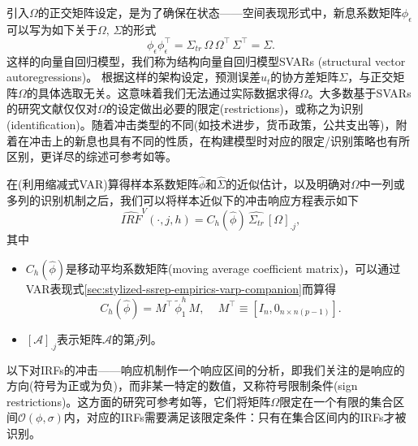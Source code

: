 引入$\Omega$的正交矩阵设定，是为了确保在状态——空间表现形式中，新息系数矩阵$\phi_{\epsilon}$可以写为如下关于$\Omega, \, \Sigma$的形式
\begin{equation}
  \label{eq:stylized-ssrep-svar-errorcoef-varcov}
  \phi_{\epsilon} \phi_{\epsilon}^{\top} = \Sigma_{tr} \, \Omega \, \Omega^{\top} \, \Sigma^{\top} = \Sigma.
\end{equation}
这样的向量自回归模型，我们称为结构向量自回归模型SVARs (structural vector autoregressions)。
根据这样的架构设定，预测误差$u_{t}$的协方差矩阵$\Sigma$，与正交矩阵$\Omega$的具体选取无关。这意味着我们无法通过实际数据求得$\Omega$。大多数基于SVARs的研究文献仅仅对$\Omega$的设定做出必要的限定(restrictions)，或称之为识别(identification)。随着冲击类型的不同(如技术进步，货币政策，公共支出等)，附着在冲击上的新息也具有不同的性质，在构建模型时对应的限定/识别策略也有所区别，更详尽的综述可参考如\cite{Cochrane:1994gi, Christiano:1999uw, Stock:2001bp}等。

在(利用缩减式VAR)算得样本系数矩阵$\hat{\phi}$和$\hat{\Sigma}$的近似估计，以及明确对$\Omega$中一列或多列的识别机制之后，我们可以将样本近似下的冲击响应方程表示如下
\begin{equation}
  \label{eq:stylized-ssrep-sample-irfs}
  \widehat{IRF}^{V} \left( \cdot , j, h\right)
  = C_h \left( \hat{\phi} \right) \, \hat{\Sigma_{tr}} \, \left[ \Omega \right]_{.j},
\end{equation}
其中
\begin{itemize}
  \item $C_h \left( \hat{\phi} \right)$是移动平均系数矩阵(moving average coefficient matrix)，可以通过VAR表现式\eqref{sec:stylized-ssrep-empirics-varp-companion}而算得
  \begin{equation}
    \label{eq:stylized-ssrep-sample-irfs-macoef}
    C_h \left( \hat{\phi} \right) = M^{\top} \, \widetilde{\phi}_{1}^{h} \, M, \quad \, M^{\top} \equiv \left[ I_{n}, 0_{n \times n \left( p - 1 \right)} \right].
  \end{equation}
  \item $\left[ \mathcal{A} \right]_{.j}$表示矩阵$\mathcal{A}$的第$j$列。
\end{itemize}

以下对IRFs的冲击——响应机制作一个响应区间的分析，即我们关注的是响应的方向(符号为正或为负)，而非某一特定的数值，又称符号限制条件(sign restrictions)。这方面的研究可参考如\cite{Faust:1998be,Canova:2002hp,Uhlig:2005ks}等，它们将矩阵$\Omega$限定在一个有限的集合区间$\mathcal{O} \left( \phi, \sigma \right)$内，对应的IRFs需要满足该限定条件：只有在集合区间内的IRFs才被识别。

